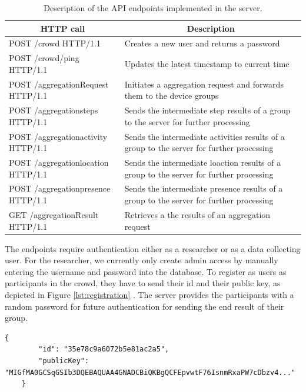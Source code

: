\begin{table}[htbp]
\centering
  \begin{tabularx}{0.92\textwidth}{|l|X|}                                                                             \hline
		\multicolumn{1}{|c|}{\textbf{HTTP call}} & \multicolumn{1}{c|}{\textbf{Description}} \\ [0.5ex] 
		\hline
		POST /crowd HTTP/1.1 & Creates a new user and returns a password \\
		\hline
		POST /crowd/ping HTTP/1.1 & Updates the latest timestamp to current time \\
		\hline
		POST /aggregationRequest HTTP/1.1 & Initiates a aggregation request and forwards them to the device groups \\ 
		\hline
		POST /aggregationsteps HTTP/1.1 & Sends the intermediate step results of a group to the server for further processing  \\ 
		\hline
		POST /aggregationactivity HTTP/1.1 & Sends the intermediate activities results of a group to the server for further processing  \\ 
		\hline
		POST /aggregationlocation HTTP/1.1 & Sends the intermediate loaction results of a group to the server for further processing  \\ 
		\hline
		POST /aggregationpresence HTTP/1.1 & Sends the intermediate presence results of a group to the server for further processing  \\ 
		\hline
		GET /aggregationResult HTTP/1.1 & Retrieves a the results of an aggregation request \\ 
		\hline
  \end{tabularx}
  \caption{Description of the API endpoints implemented in the server.}
  \label{tab:rest}
\end{table}

The endpoints require authentication either as a researcher or as a data collecting user. For the researcher, we currently only create admin access by manually entering the username and password into the database. To register as users as participants in the crowd, they have to send their id and their public key, as depicted in Figure \ref{lst:registration} . The server provides the participants with a random password for future authentication for sending the end result of their group.

\begin{lstlisting}[caption=Registration message sent to the server, label={lst:registration}]
	{
	    "id": "35e78c9a6072b5e81ac2a5",
	    "publicKey": "MIGfMA0GCSqGSIb3DQEBAQUAA4GNADCBiQKBgQCFEpvwtF76IsnmRxaPW7cDbzv4..."
	}
\end{lstlisting}

